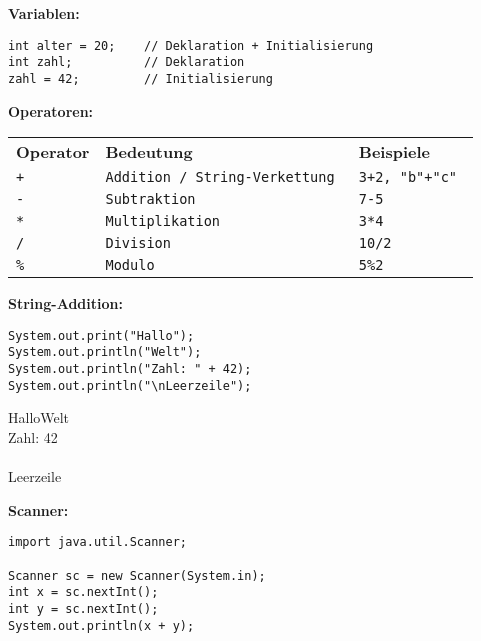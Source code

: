 \documentclass{../../sheet}
\begin{document}
\newpage

\textbf{Variablen:}
\begin{center}
  \begin{verbatim}
int alter = 20;    // Deklaration + Initialisierung
int zahl;          // Deklaration
zahl = 42;         // Initialisierung
  \end{verbatim}
\end{center}
\bigskip
\textbf{Operatoren:}
\begin{center}
  \begin{tabular}{l l l}
    \rowcolor{tablehead}
    \textbf{Operator
    }           & \textbf{Bedeutung
    }           & \textbf{Beispiele
    }                                                  \\
    \texttt{+}  & \texttt{Addition / String-Verkettung
    }           & \texttt{3+2, "b"+"c"
    }                                                  \\
    \texttt{-}  & \texttt{Subtraktion
    }           & \texttt{7-5
    }                                                  \\
    \texttt{*}  & \texttt{Multiplikation
    }           & \texttt{3*4
    }                                                  \\
    \texttt{/}  & \texttt{Division
    }           & \texttt{10/2
    }                                                  \\
    \texttt{\%} & \texttt{Modulo
    }           & \texttt{5\%2
    }                                                  \\
  \end{tabular}
\end{center}
\bigskip
\textbf{String-Addition:}
\begin{verbatim}
System.out.print("Hallo");
System.out.println("Welt");
System.out.println("Zahl: " + 42);
System.out.println("\nLeerzeile");
  \end{verbatim}
\begin{ausgabe}
  HalloWelt\\
  Zahl: 42\\\\
  Leerzeile
\end{ausgabe}
\bigskip
\textbf{Scanner:}
\begin{verbatim}
import java.util.Scanner;

Scanner sc = new Scanner(System.in);
int x = sc.nextInt();
int y = sc.nextInt();
System.out.println(x + y);
  \end{verbatim}
\newpage
\end{document}
